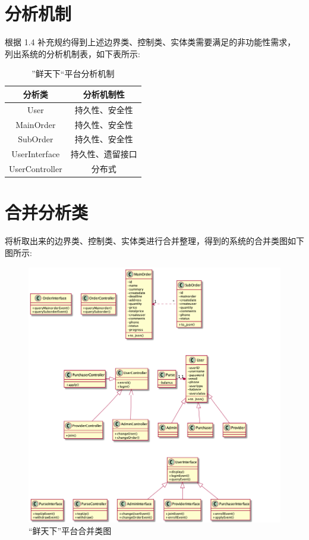 
\section{分析机制} 
	根据 1.4 补充规约得到上述边界类、控制类、实体类需要满足的非功能性需求， 列出系统的分析机制表，如下表所示:

	\begin{table}[h]
		\centering
		\caption{”鲜天下“平台分析机制}
		\begin{tabular}{|c|c|}
			\hline  
				分析类 & 分析机制性\\
			\hline  
				User & 持久性、安全性\\
			\hline  
				MainOrder & 持久性、安全性\\
			\hline
				SubOrder & 持久性、安全性\\
			\hline  
				UserInterface & 持久性、遗留接口\\
			\hline
				UserController & 分布式\\
			\hline
		\end{tabular}
	\end{table}



\section{合并分析类}


	将析取出来的边界类、控制类、实体类进行合并整理，得到的系统的合并类图如下图所示:\\
	\begin{figure}[htp]
		    \begin{adjustwidth}{-1cm}{-1cm}
		    \centering
		    \includegraphics[width=20cm]{report/figure/class_system.png}
		    \caption{“鲜天下”平台合并类图}
		    \end{adjustwidth}
		\end{figure}
